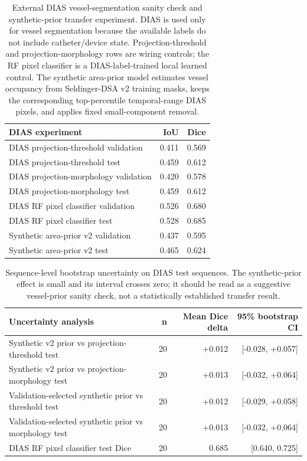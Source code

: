 \documentclass[10pt]{article}
\begin{document}
\begin{table}[h]
\centering
\small
\begin{tabular}{lrr}
\toprule
DIAS experiment & IoU & Dice \\
\midrule
DIAS projection-threshold validation & 0.411 & 0.569 \\
DIAS projection-threshold test & 0.459 & 0.612 \\
DIAS projection-morphology validation & 0.420 & 0.578 \\
DIAS projection-morphology test & 0.459 & 0.612 \\
DIAS RF pixel classifier validation & 0.526 & 0.680 \\
DIAS RF pixel classifier test & 0.528 & 0.685 \\
Synthetic area-prior v2 validation & 0.437 & 0.595 \\
Synthetic area-prior v2 test & 0.465 & 0.624 \\
\bottomrule
\end{tabular}
\caption{External DIAS vessel-segmentation sanity check and synthetic-prior transfer experiment. DIAS is used only for vessel segmentation because the available labels do not include catheter/device state. Projection-threshold and projection-morphology rows are wiring controls; the RF pixel classifier is a DIAS-label-trained local learned control. The synthetic area-prior model estimates vessel occupancy from Seldinger-DSA v2 training masks, keeps the corresponding top-percentile temporal-range DIAS pixels, and applies fixed small-component removal.}
\end{table}

\begin{table}[h]
\centering
\small
\begin{tabular}{lrrr}
\toprule
Uncertainty analysis & n & Mean Dice delta & 95\% bootstrap CI \\
\midrule
Synthetic v2 prior vs projection-threshold test & 20 & +0.012 & [-0.028, +0.057] \\
Synthetic v2 prior vs projection-morphology test & 20 & +0.013 & [-0.032, +0.064] \\
Validation-selected synthetic prior vs threshold test & 20 & +0.012 & [-0.029, +0.058] \\
Validation-selected synthetic prior vs morphology test & 20 & +0.013 & [-0.032, +0.064] \\
DIAS RF pixel classifier test Dice & 20 & 0.685 & [0.640, 0.725] \\
\bottomrule
\end{tabular}
\caption{Sequence-level bootstrap uncertainty on DIAS test sequences. The synthetic-prior effect is small and its interval crosses zero; it should be read as a suggestive vessel-prior sanity check, not a statistically established transfer result.}
\end{table}
\end{document}
